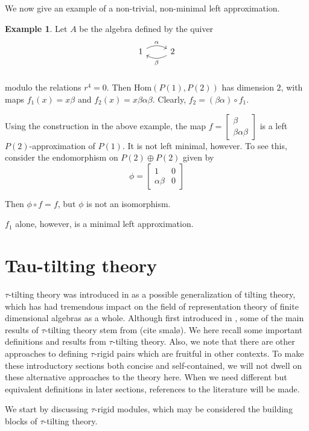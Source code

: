 \documentclass[]{article}
\theoremstyle{definition}
\newtheorem{example}{Example}[section]
\newcommand{\tu}{\ensuremath{\tau}}
\begin{document}
We now give an example of a non-trivial, non-minimal left approximation.

\begin{example}
	Let $A$ be the algebra defined by the quiver
	\[
	\begin{tikzcd}
	1 \arrow[r,bend left,"\alpha"] & 2 \arrow[l,bend left,"\beta"]  \\
	\end{tikzcd}
	\]
	
	modulo the relations $r^4 = 0$. Then $\text{Hom}(P(1),P(2))$ has dimension $2$, with maps $f_1(x) = x \beta$ and $f_2(x) =  x\beta\alpha\beta$. Clearly, $f_2 = (\beta\alpha) \circ f_1$. 
	
	Using the construction in the above example, the map $f = \begin{bmatrix} \beta \\ \beta\alpha\beta \end{bmatrix}$ is a left $P(2)$-approximation of $P(1)$. It is not left minimal, however. To see this, consider the endomorphism on $P(2) \oplus P(2)$ given by \[\phi = \begin{bmatrix} 1 & 0 \\ \alpha\beta & 0\end{bmatrix}\]
	
	Then $\phi \circ f = f$, but $\phi$ is not an isomorphism. 
	
	$f_1$ alone, however, is a minimal left approximation.
\end{example}


\section{Tau-tilting theory}
$\tau$-tilting theory was introduced in \cite{tau} as a possible generalization of tilting theory, which has had tremendous impact on the field of representation theory of finite dimensional algebras as a whole. Although first introduced in \cite{tau}, some of the main results of $\tau$-tilting theory stem from (cite smalø). We here recall some important definitions and results from $\tau$-tilting theory. Also, we note that there are other approaches to defining \tu-rigid pairs which are fruitful in other contexts. To make these introductory sections both concise and self-contained, we will not dwell on these alternative approaches to the theory here.  When we need different but equivalent definitions in later sections, references to the literature will be made.

We start by discussing $\tau$-rigid modules, which may be considered the building blocks of $\tau$-tilting theory. 
\end{document}
